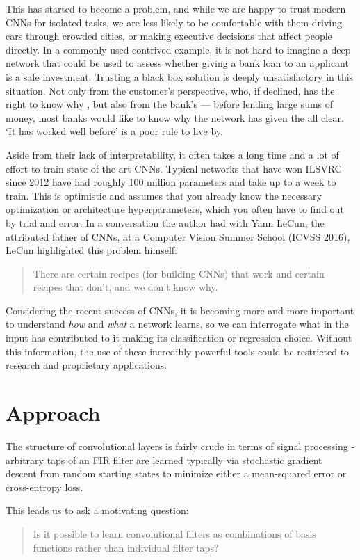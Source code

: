 This has started to become a problem, and while we are happy to trust modern
CNNs for isolated tasks, we are less likely to be comfortable with them driving
cars through crowded cities, or making executive decisions that affect people
directly. In a commonly used contrived example, it is not hard to imagine a deep
network that could be used to assess whether giving a bank loan to an applicant
is a safe investment. Trusting a black box solution is deeply unsatisfactory in
this situation. Not only from the customer's perspective, who, if declined, has
the right to know why \cite{goodman_european_2016}, but
also from the bank's --- before lending large sums of money, most banks
would like to know why the network has given the all clear. `It has worked well
before' is a poor rule to live by.

Aside from their lack of interpretability, it often takes a long time and a lot of
effort to train state-of-the-art CNNs. Typical networks that have won ILSVRC
since 2012 have had roughly 100 million parameters and take up to a week to train. This
is optimistic and assumes that you already know the necessary optimization or
architecture hyperparameters, which you often have to find out by trial and error.
In a conversation the author had with Yann LeCun, the attributed father of
CNNs, at a Computer Vision Summer School (ICVSS 2016), LeCun highlighted this problem
himself:
\begin{quote}
  There are certain recipes (for building CNNs) that work and certain recipes
  that don't, and we don't know why.
\end{quote}

Considering the recent success of CNNs, it is becoming more and more
important to understand \emph{how} and \emph{what} a network learns, so we can
interrogate what in the input has contributed to it making its classification or regression choice.
Without this information, the use of these incredibly powerful tools could be
restricted to research and proprietary applications.

\section{Approach}
The structure of convolutional layers is fairly crude in terms of signal
processing - arbitrary taps of an FIR filter are learned typically via
stochastic gradient descent from random starting states to minimize either a
mean-squared error or cross-entropy loss.

This leads us to ask a motivating question:
%
\begin{quote}
  Is it possible to learn convolutional filters as combinations of basis
  functions rather than individual filter taps?
\end{quote}

